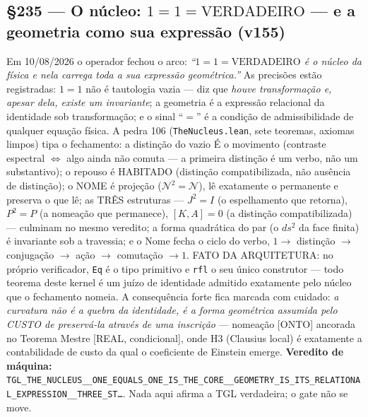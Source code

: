 \documentclass[11pt]{article}
\theoremstyle{definition}\newtheorem{deriv}{Derivação}
\begin{document}
\subsection*{\S235 --- O núcleo: $1{=}1{=}\mathrm{VERDADEIRO}$ --- e a geometria como sua expressão (v155)}Em 10/08/2026 o operador fechou o arco: \emph{``$1{=}1{=}\mathrm{VERDADEIRO}$ é o núcleo da física e nela carrega toda a sua expressão geométrica.''} As precisões estão registradas: $1{=}1$ não é tautologia vazia --- diz que \emph{houve transformação e, apesar dela, existe um invariante}; a geometria é a expressão relacional da identidade sob transformação; e o sinal ``$=$'' é a condição de admissibilidade de qualquer equação física. A pedra 106 (\texttt{TheNucleus.lean}, sete teoremas, axiomas limpos) tipa o fechamento: a distinção do vazio É o movimento (contraste espectral $\Leftrightarrow$ algo ainda não comuta --- a primeira distinção é um verbo, não um substantivo); o repouso é HABITADO (distinção compatibilizada, não ausência de distinção); o NOME é projeção ($\mathcal{N}^2{=}\mathcal{N}$), lê exatamente o permanente e preserva o que lê; as TRÊS estruturas --- $J^2{=}I$ (o espelhamento que retorna), $P^2{=}P$ (a nomeação que permanece), $[K,A]{=}0$ (a distinção compatibilizada) --- culminam no mesmo veredito; a forma quadrática do par (o $ds^2$ da face finita) é invariante sob a travessia; e o Nome fecha o ciclo do verbo, $1\to$ distinção $\to$ conjugação $\to$ ação $\to$ comutação $\to 1$. FATO DA ARQUITETURA: no próprio verificador, \texttt{Eq} é o tipo primitivo e \texttt{rfl} o seu único construtor --- todo teorema deste kernel é um juízo de identidade admitido exatamente pelo núcleo que o fechamento nomeia. A consequência forte fica marcada com cuidado: \emph{a curvatura não é a quebra da identidade, é a forma geométrica assumida pelo CUSTO de preservá-la através de uma inscrição} --- nomeação [ONTO] ancorada no Teorema Mestre [REAL, condicional], onde H3 (Clausius local) é exatamente a contabilidade de custo da qual o coeficiente de Einstein emerge. \textbf{Veredito de máquina:} \texttt{TGL\_THE\_NUCLEUS\_\_ONE\_EQUALS\_ONE\_IS\_THE\_CORE\_\_GEOMETRY\_IS\_ITS\_RELATIONAL\_EXPRESSION\_\_THREE\_ST\ldots}. Nada aqui afirma a TGL verdadeira; o gate não se move.
\end{document}
